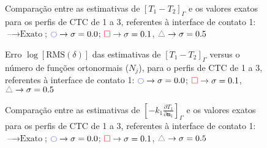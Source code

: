 
\begin{figure}[h!b]
	\caption{Comparação entre as estimativas de $[T_1 - T_2]_\Gamma$ e os valores exatos para os perfis de CTC de 1 a 3, referentes à interface de contato 1: $\text{--} \rightarrow \text{Exato}$; $\textcolor{blue}{\ocircle} \rightarrow \sigma = 0.0$; $\textcolor{red}{\square} \rightarrow \sigma = 0.1$, $\textcolor{gray}{\triangle} \rightarrow \sigma = 0.5$}
\end{figure}

\begin{figure}[h!b]
	\caption{Erro $\log[\text{RMS}(\delta)]$ das estimativas de $[T_1 - T_2]_\Gamma$ versus o número de funções ortonormais ($N_j$), para o perfis de CTC de 1 a 3, referentes à interface de contato 1: $\textcolor{blue}{\ocircle} \rightarrow \sigma = 0.0$; $\textcolor{red}{\square} \rightarrow \sigma = 0.1$, $\textcolor{gray}{\triangle} \rightarrow \sigma = 0.5$}
\end{figure}

\begin{figure}[h!b]
	\caption{Comparação entre as estimativas de $\left[-k_1 \frac{\partial T_1}{\partial\mathbf{n}_1}\right]_\Gamma$ e os valores exatos para os perfis de CTC de 1 a 3, referentes à interface de contato 1: $\text{--} \rightarrow \text{Exato}$; $\textcolor{blue}{\ocircle} \rightarrow \sigma = 0.0$; $\textcolor{red}{\square} \rightarrow \sigma = 0.1$, $\textcolor{gray}{\triangle} \rightarrow \sigma = 0.5$}
\end{figure}

